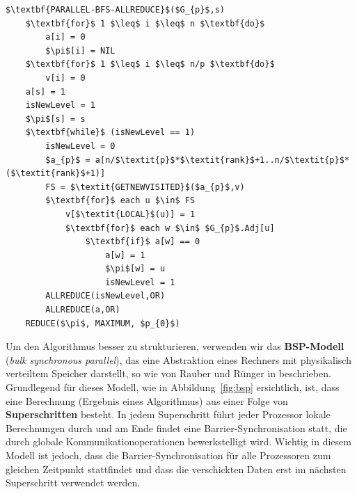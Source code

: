 \documentclass[11pt,a4paper]{article}
\begin{document}
\begin{lstlisting}[caption={Die Prozedur \lstinline{PARALLEL-BFS-ALLREDUCE} wird von allen verfügbaren Prozessoren parallel aufgerufen. Nach jeder Abarbeitung eines Levels findet durch die \lstinline{ALLREDUCE} Operationen eine sogenannte Barrier-Synchronisation statt, bei der zwischen den Prozessoren ausgetauscht wird, ob es überhaupt einen neu besuchten Knoten gibt (\lstinline{isNewLevel}), beziehungsweise wird das Array \lstinline{a} synchronisiert.},label=par_allvisited]
$\textbf{PARALLEL-BFS-ALLREDUCE}$($G_{p}$,s)
	$\textbf{for}$ 1 $\leq$ i $\leq$ n $\textbf{do}$
		a[i] = 0
		$\pi$[i] = NIL
	$\textbf{for}$ 1 $\leq$ i $\leq$ n/p $\textbf{do}$
		v[i] = 0
	a[s] = 1
	isNewLevel = 1
	$\pi$[s] = s
	$\textbf{while}$ (isNewLevel == 1)
		isNewLevel = 0
		$a_{p}$ = a[n/$\textit{p}$*$\textit{rank}$+1..n/$\textit{p}$*($\textit{rank}$+1)]
		FS = $\textit{GETNEWVISITED}$($a_{p}$,v)
		$\textbf{for}$ each u $\in$ FS
			v[$\textit{LOCAL}$(u)] = 1
			$\textbf{for}$ each w $\in$ $G_{p}$.Adj[u]
				$\textbf{if}$ a[w] == 0
					a[w] = 1
					$\pi$[w] = u
					isNewLevel = 1
		ALLREDUCE(isNewLevel,OR)
		ALLREDUCE(a,OR)
	REDUCE($\pi$, MAXIMUM, $p_{0}$)
\end{lstlisting}
Um den Algorithmus besser zu strukturieren, verwenden wir das \textbf{BSP-Modell} (\textit{bulk synchronous parallel}), das eine Abstraktion eines Rechners mit physikalisch verteiltem Speicher darstellt, so wie von Rauber und Rünger in \cite{rauber} beschrieben. Grundlegend für dieses Modell, wie in Abbildung~\ref{fig:bsp} ersichtlich, ist, dass eine Berechnung (Ergebnis eines Algorithmus) aus einer Folge von \textbf{Superschritten} besteht. In jedem Superschritt führt jeder Prozessor lokale Berechnungen durch und am Ende findet eine Barrier-Synchronisation statt, die durch globale Kommunikationoperationen bewerkstelligt wird. Wichtig in diesem Modell ist jedoch, dass die Barrier-Synchronisation für alle Prozessoren zum gleichen Zeitpunkt stattfindet und dass die verschickten Daten erst im nächsten Superschritt verwendet werden.
\end{document}
